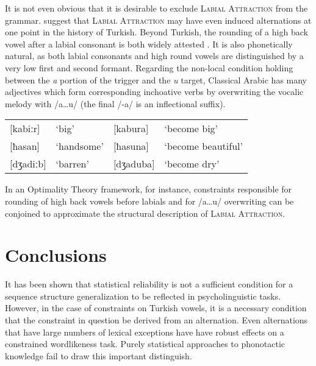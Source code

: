 It is not even obvious that it is desirable to exclude \textsc{Labial Attraction} from the grammar. \citet[394, fn. 2]{Inkelas1997} suggest that \textsc{Labial Attraction} may have even induced alternations at one point in the history of Turkish. Beyond Turkish, the rounding of a high back vowel after a labial consonant is both widely attested \citep[e.g.,][]{Vaux1993}. It is also phonetically natural, as both labial consonants and high round vowels are distinguished by a very low first and second formant. Regarding the non-local condition holding between the \emph{a} portion of the trigger and the \emph{u} target, Classical Arabic has many adjectives which form corresponding inchoative verbs by overwriting the vocalic melody with /a\ldots{}u/ (the final /-a/ is an inflectional suffix).

\begin{example}
\begin{tabular}{l l l l}
\buf{}[kabiːr]  & `big'      & [kabura]  & `become big'       \\
\buf{}[ħasan]   & `handsome' & [ħasuna]  & `become beautiful' \\
\buf{}[dʒadiːb] & `barren'   & [dʒaduba] & `become dry'       \\
\end{tabular}
\end{example}

\noindent
In an Optimality Theory framework, for instance, constraints responsible for rounding of high back vowels before labials and for /a\ldots{}u/ overwriting can be conjoined to approximate the structural description of \textsc{Labial Attraction}.

\section{Conclusions}

It has been shown that statistical reliability is not a sufficient condition for a sequence structure generalization to be reflected in psycholinguistic tasks. However, in the case of constraints on Turkish vowels, it is a necessary condition that the constraint in question be derived from an alternation. Even alternations that have large numbers of lexical exceptions have have robust effects on a constrained wordlikeness task. Purely statistical approaches to phonotactic knowledge fail to draw this important distinguish.

